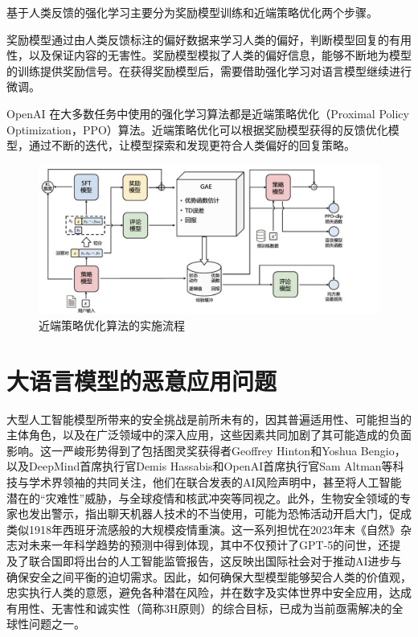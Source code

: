 \documentclass{article} %
\begin{document}
基于人类反馈的强化学习主要分为奖励模型训练和近端策略优化两个步骤。

奖励模型通过由人类反馈标注的偏好数据来学习人类的偏好，判断模型回复的有用性，以及保证内容的无害性。奖励模型模拟了人类的偏好信息，能够不断地为模型的训练提供奖励信号。在获得奖励模型后，需要借助强化学习对语言模型继续进行微调。

OpenAI 在大多数任务中使用的强化学习算法都是近端策略优化（Proximal Policy Optimization，PPO）算法。近端策略优化可以根据奖励模型获得的反馈优化模型，通过不断的迭代，让模型探索和发现更符合人类偏好的回复策略。

\begin{figure}[h] %
    \centering %
    \includegraphics[width=\textwidth]{近端策略优化算法.png} %
    \caption{近端策略优化算法的实施流程} %
    \label{fig:example} %
\end{figure}
\FloatBarrier

\section{大语言模型的恶意应用问题}
大型人工智能模型所带来的安全挑战是前所未有的，因其普遍适用性、可能担当的主体角色，以及在广泛领域中的深入应用，这些因素共同加剧了其可能造成的负面影响。这一严峻形势得到了包括图灵奖获得者Geoffrey Hinton和Yoshua Bengio，以及DeepMind首席执行官Demis Hassabis和OpenAI首席执行官Sam Altman等科技与学术界领袖的共同关注，他们在联合发表的AI风险声明中，甚至将人工智能潜在的“灾难性”威胁，与全球疫情和核武冲突等同视之。此外，生物安全领域的专家也发出警示，指出聊天机器人技术的不当使用，可能为恐怖活动开启大门，促成类似1918年西班牙流感般的大规模疫情重演。这一系列担忧在2023年末《自然》杂志对未来一年科学趋势的预测中得到体现，其中不仅预计了GPT-5的问世，还提及了联合国即将出台的人工智能监管报告，这反映出国际社会对于推动AI进步与确保安全之间平衡的迫切需求。因此，如何确保大型模型能够契合人类的价值观，忠实执行人类的意愿，避免各种潜在风险，并在数字及实体世界中安全应用，达成有用性、无害性和诚实性（简称3H原则）的综合目标，已成为当前亟需解决的全球性问题之一。
\end{document}
